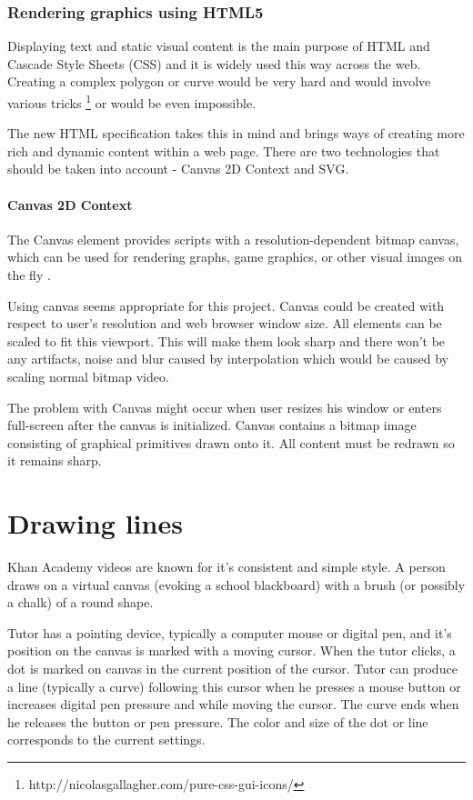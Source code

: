 \subsubsection{Rendering graphics using HTML5}

Displaying text and static visual content is the main purpose of HTML and Cascade Style Sheets (CSS) and it is widely used this way across the web. Creating a complex polygon or curve would be very hard and would involve various tricks \footnote{http://nicolasgallagher.com/pure-css-gui-icons/} or would be even impossible. 

The new HTML specification takes this in mind and brings ways of creating more rich and dynamic content within a web page. There are two technologies that should be taken into account - Canvas 2D Context and SVG.

\paragraph{Canvas 2D Context}
The Canvas element provides scripts with a resolution-dependent bitmap canvas, which can be used for rendering graphs, game graphics, or other visual images on the fly \cite{html5_canvas}. 

Using canvas seems appropriate for this project. Canvas could be created with respect to user's resolution and web browser window size. All elements can be scaled to fit this viewport. This will make them look sharp and there won't be any artifacts, noise and blur caused by interpolation which would be caused by scaling normal bitmap video.

The problem with Canvas might occur when user resizes his window or enters full-screen after the canvas is initialized. Canvas contains a bitmap image consisting of graphical primitives drawn onto it. All content must be redrawn so it remains sharp.











\section{Drawing lines}
Khan Academy videos are known for it's consistent and simple style. A person draws on a virtual canvas (evoking a school blackboard) with a brush (or possibly a chalk) of a round shape.

Tutor has a pointing device, typically a computer mouse or digital pen, and it's position on the canvas is marked with a moving cursor. When the tutor clicks, a dot is marked on canvas in the current position of the cursor. Tutor can produce a line (typically a curve) following this cursor when he presses a mouse button or increases digital pen pressure and while moving the cursor. The curve ends when he releases the button or pen pressure. The color and size of the dot or line corresponds to the current settings.


